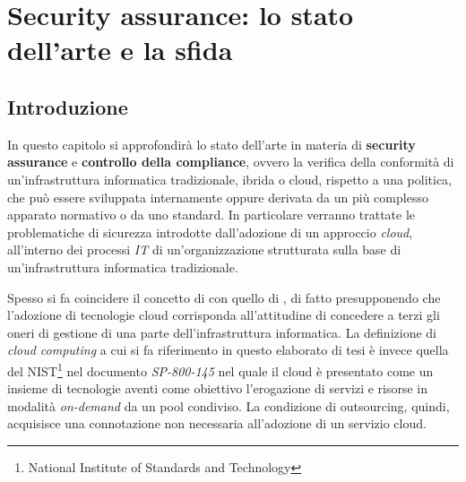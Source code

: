 \documentclass[../main.tex]{subfiles}
\begin{document}
\chapter{Security assurance: lo stato dell'arte e la sfida}
\section{Introduzione}
In questo capitolo si approfondirà lo stato dell'arte in materia di \textbf{security assurance} e \textbf{controllo della compliance}, ovvero la verifica della conformità di un'infrastruttura informatica tradizionale, ibrida o cloud, rispetto a una politica, che può essere sviluppata internamente oppure derivata da un più complesso apparato normativo o da uno standard.
In particolare verranno trattate le problematiche di sicurezza introdotte dall'adozione di un approccio \textit{cloud}, all'interno dei processi \textit{IT} di un'organizzazione strutturata sulla base di un'infrastruttura informatica tradizionale.

Spesso si fa coincidere il concetto di  con quello di , di fatto presupponendo che l'adozione di tecnologie cloud corrisponda all'attitudine di concedere a terzi gli oneri di gestione di una parte dell'infrastruttura informatica.
La definizione di \textit{cloud computing} a cui si fa riferimento in questo elaborato di tesi è invece quella del NIST\footnote{National Institute of Standards and Technology} nel documento \textit{SP-800-145} nel quale il cloud è presentato come un insieme di tecnologie aventi come obiettivo l'erogazione di servizi e risorse in modalità \textit{on-demand} da un pool condiviso.
La condizione di outsourcing, quindi, acquisisce una connotazione non necessaria all'adozione di un servizio cloud.
\end{document}
